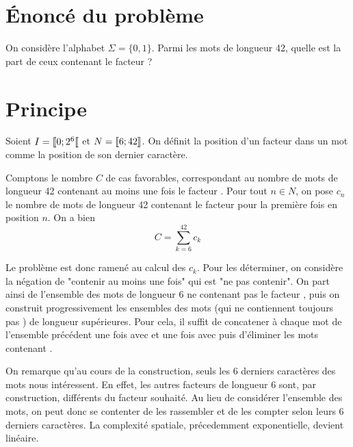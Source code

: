 \documentclass{hibiscus}
\begin{document}
\maketitle

\section{Énoncé du problème}

On considère l'alphabet $\Sigma = \{0, 1\}$. Parmi les mots de longueur 42, quelle est la part de ceux contenant le facteur  ?

\section{Principe}

\par \medskip Soient $I = \text{\textlbrackdbl} 0 ; 2^6 \text{\textlbrackdbl}$ et $N = \text{\textlbrackdbl} 6 ; 42 \text{\textrbrackdbl}$. On définit la position d'un facteur dans un mot comme la position de son dernier caractère.

\par \medskip Comptons le nombre $C$ de cas favorables, correspondant au nombre de mots de longueur 42 contenant au moins une fois le facteur . Pour tout $n \in N$, on pose $c_n$ le nombre de mots de longueur 42 contenant le facteur  pour la première fois en position $n$. On a bien $$ C = \sum_{k = 6}^{42}{c_k} $$

\par \medskip Le problème est donc ramené au calcul des $c_k$. Pour les déterminer, on considère la négation de "contenir au moins une fois" qui est "ne pas contenir". On part ainsi de l'ensemble des mots de longueur 6 ne contenant pas le facteur , puis on construit progressivement les ensembles des mots (qui ne contiennent toujours pas ) de longueur supérieures. Pour cela, il suffit de concatener à chaque mot de l'ensemble précédent une fois avec  et une fois avec  puis d'éliminer les mots contenant .

\par \medskip On remarque qu'au cours de la construction, seuls les 6 derniers caractères des mots nous intéressent. En effet, les autres facteurs de longueur 6 sont, par construction, différents du facteur souhaité. Au lieu de considérer l'ensemble des mots, on peut donc se contenter de les rassembler et de les compter selon leurs 6 derniers caractères. La complexité spatiale, précedemment exponentielle, devient linéaire.
\end{document}
